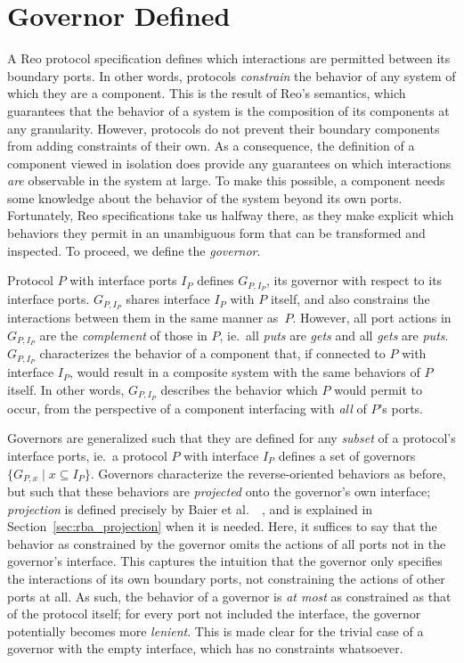 \section{Governor Defined}
\label{sec:governor_defined}
A Reo protocol specification defines which interactions are permitted between its boundary ports. In other words, protocols \textit{constrain} the behavior of any system of which they are a component. This is the result of Reo's semantics, which 
guarantees that the behavior of a system is the composition of its components at any granularity. However, protocols do not prevent their boundary components from adding constraints of their own. As a consequence, the definition of a component viewed in isolation does provide any guarantees on which interactions \textit{are} observable in the system at large. To make this possible, a component needs some knowledge about the behavior of the system beyond its own ports. Fortunately, Reo specifications take us halfway there, as they make explicit which behaviors they permit in an unambiguous form that can be transformed and inspected. To proceed, we define the \textit{governor}.

Protocol $P$ with interface ports $I_P$ defines $G_{P,I_P}$, its governor with respect to its interface ports. $G_{P,I_P}$ shares interface $I_P$ with $P$ itself, and also constrains the interactions between them in the same manner as~$P$. However, all port actions in $G_{P,I_P}$ are the \textit{complement} of those in $P$, ie.\ all \textit{puts} are \textit{gets} and all \textit{gets} are \textit{puts}. $G_{P,I_P}$ characterizes the behavior of a component that, if connected to $P$ with interface $I_P$, would result in a composite system with the same behaviors of $P$ itself. In other words, $G_{P,I_P}$ describes the behavior which $P$ would permit to occur, from the perspective of a component interfacing with \textit{all} of $P$'s ports.

Governors are generalized such that they are defined for any \textit{subset} of a protocol's interface ports, ie.\ a protocol $P$ with interface $I_P$ defines a set of governors $\{G_{P,x} \; | \; x\subseteq I_P\}$. Governors characterize the reverse-oriented behaviors as before, but such that these behaviors are \textit{projected} onto the governor's own interface; \textit{projection} is defined precisely by Baier et al.\ ~\cite{baier2006modeling}, and is explained in Section~\ref{sec:rba_projection} when it is needed. Here, it suffices to say that the behavior as constrained by the governor omits the actions of all ports not in the governor's interface. This captures the intuition that the governor only specifies the interactions of its own boundary ports, not constraining the actions of other ports at all. As such, the behavior of a governor is \textit{at most} as constrained as that of the protocol itself; for every port not included the interface, the governor potentially becomes more \textit{lenient}. This is made clear for the trivial case of a governor with the empty interface, which has no constraints whatsoever.

